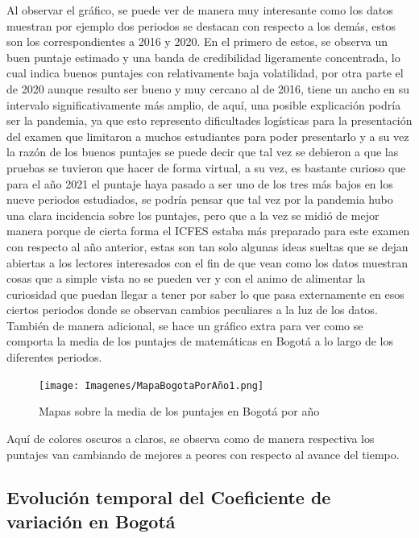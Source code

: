 \documentclass[12pt]{article}
\begin{document}
Al observar el gráfico, se puede ver de manera muy interesante como los datos muestran por ejemplo dos periodos se destacan con respecto a los demás, estos son los correspondientes a 2016 y 2020. En el primero de estos, se observa un buen puntaje estimado y una banda de credibilidad ligeramente concentrada, lo cual indica buenos puntajes con relativamente baja volatilidad, por otra parte el de 2020 aunque resulto ser bueno y muy cercano al de 2016, tiene un ancho en su intervalo significativamente más amplio, de aquí, una posible explicación podría ser la pandemia, ya que esto represento dificultades logísticas para la presentación del examen que limitaron a muchos estudiantes para poder presentarlo y a su vez la razón de los buenos puntajes se puede decir que tal vez se debieron a que las pruebas se tuvieron que hacer de forma virtual, a su vez, es bastante curioso que para el año 2021 el puntaje haya pasado a ser uno de los tres más bajos en los nueve periodos estudiados, se podría pensar que tal vez por la pandemia hubo una clara incidencia sobre los puntajes, pero que a la vez se midió de mejor manera porque de cierta forma el ICFES estaba más preparado para este examen con respecto al año anterior, estas son tan solo algunas ideas sueltas que se dejan abiertas a los lectores interesados con el fin de que vean como los datos muestran cosas que a simple vista no se pueden ver y con el animo de alimentar la curiosidad que puedan llegar a tener por saber lo que pasa externamente en esos ciertos periodos donde se observan cambios peculiares a la luz de los datos.\\

También de manera adicional, se hace un gráfico extra para ver como se comporta la media de los puntajes de matemáticas en Bogotá a lo largo de los diferentes periodos.

\begin{figure}[H]
    \centering
    \texttt{[image: Imagenes/MapaBogotaPorAño1.png]}
    \caption{Mapas sobre la media de los puntajes en Bogotá por año}
    \label{fig_enter_label}
\end{figure}

Aquí de colores oscuros a claros, se observa como de manera respectiva los puntajes van cambiando de mejores a peores con respecto al avance del tiempo.

\subsection{Evolución temporal del Coeficiente de variación en Bogotá}
\end{document}
